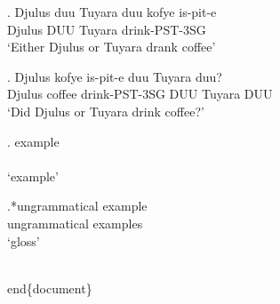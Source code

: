 \documentclass{article}
\begin{document}
\exg. Djulus duu Tuyara duu kofye is-pit-e\\
Djulus DUU Tuyara drink-PST-3SG\\
`Either Djulus or Tuyara drank coffee'

\exg. Djulus kofye is-pit-e duu Tuyara duu?\\
Djulus coffee drink-PST-3SG DUU Tuyara DUU\\
`Did Djulus or Tuyara drink coffee?'

\exg. example\\
\\
`example'

\exg.*ungrammatical example\\
ungrammatical examples\\
`gloss'

\\end\{document\}
\end{document}

